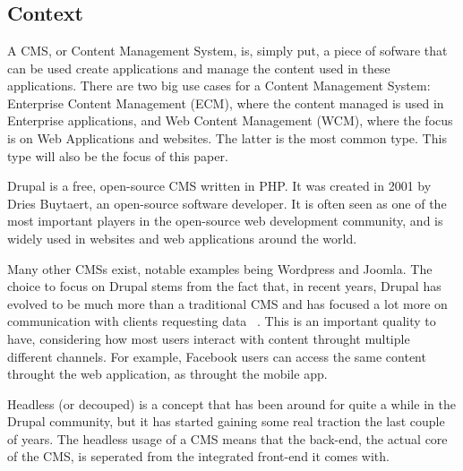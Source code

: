 
\chapter{}
\label{ch:inleiding}

\section{Context}
A \gls{CMS}, or Content Management System, is, simply put, a piece of sofware that can be used create applications and manage the content used in these applications. There are two big use cases for a Content Management System: Enterprise Content Management (ECM), where the content managed is used in Enterprise applications, and Web Content Management (WCM), where the focus is on Web Applications and websites. The latter is the most common type. This type will also be the focus of this paper.

\gls{Drupal} is a free, open-source CMS written in \gls{PHP}. It was created in 2001 by Dries Buytaert, an open-source software developer. It is often seen as one of the most important players in the open-source web development community, and is widely used in websites and web applications around the world.

Many other CMSs exist, notable examples being \gls{Wordpress} and \gls{Joomla}. The choice to focus on Drupal stems from the fact that, in recent years, Drupal has evolved to be much more than a traditional CMS and has focused a lot more on communication with clients requesting data ~\autocite{So2018}. This is an important quality to have, considering how most users interact with content throught multiple different channels. For example, Facebook users can access the same content throught the web application, as throught the mobile app.

\gls{Headless} (or decouped) is a concept that has been around for quite a while in the Drupal community, but it has started gaining some real traction the last couple of years. The headless usage of a CMS means that the back-end, the actual core of the CMS, is seperated from the integrated front-end it comes with. 

\section{}
\label{sec:probleemstelling}

